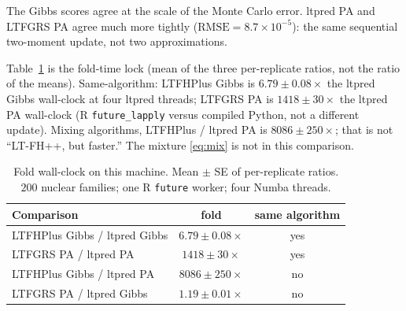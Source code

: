 \documentclass[11pt,a4paper]{article}
\begin{document}
\begin{table}[ht]
\centering
\caption{Same families and bounds.
R packages used one \texttt{future} worker; ltpred Gibbs used four
Numba threads.
RMSE is against LTFHPlus Gibbs except the PA--PA sentence below.
Peak RSS is the isolated process, in MiB.}
\label{tab:ltfhplus}
\end{table}

The Gibbs scores agree at the scale of the Monte Carlo error.
ltpred PA and LTFGRS PA agree much more tightly
($\mathrm{RMSE}=8.7\times 10^{-5}$): the same sequential two-moment
update, not two approximations.

Table~\ref{tab:ltfhplus-fold} is the fold-time lock
(mean of the three per-replicate ratios, not the ratio of the means).
Same-algorithm: LTFHPlus Gibbs is $6.79\pm 0.08\times$ the ltpred
Gibbs wall-clock at four ltpred threads; LTFGRS PA is $1418\pm 30\times$ the ltpred PA
wall-clock (R \texttt{future\_lapply} versus compiled Python, not a
different update).
Mixing algorithms, LTFHPlus / ltpred PA is $8086\pm 250\times$;
that is not ``LT-FH++, but faster.''
The mixture \eqref{eq:mix} is not in this comparison.

\begin{table}[ht]
\centering
\caption{Fold wall-clock on this machine.
Mean $\pm$ SE of per-replicate ratios.
$200$ nuclear families; one R \texttt{future} worker; four Numba threads.}
\label{tab:ltfhplus-fold}
\small
\begin{tabular}{@{}lcc@{}}
\toprule
Comparison & fold & same algorithm \\
\midrule
LTFHPlus Gibbs / ltpred Gibbs
  & $6.79\pm 0.08\times$ & yes \\
LTFGRS PA / ltpred PA
  & $1418\pm 30\times$ & yes \\
LTFHPlus Gibbs / ltpred PA
  & $8086\pm 250\times$ & no \\
LTFGRS PA / ltpred Gibbs
  & $1.19\pm 0.01\times$ & no \\
\bottomrule
\end{tabular}
\end{table}
\end{document}

